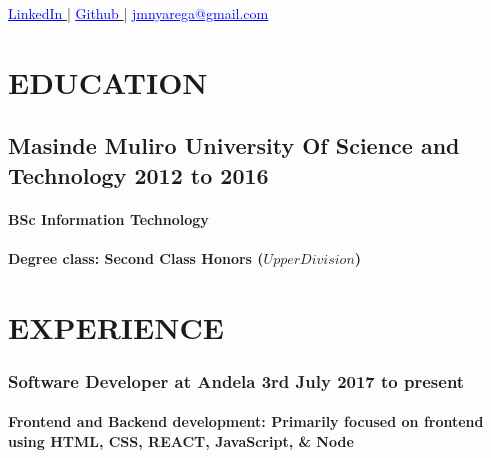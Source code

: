 \documentclass{article}
\author{Josiah Mokobo Nyarega}
\begin{document}
\renewcommand{\maketitle}{
  \begin{center}
    {
      \huge\bfseries
      \theauthor
    }

    \href{https://www.linkedin.com/in/josiah-nyarega-84820a103}{
      \textcolor{blue}{
        \underline{LinkedIn}
      }
    } |
    \href{https://www.github.com/jmnyarega}{
      \textcolor{blue}{
      \underline{Github}
      }
    } |
    \href{jmnyarega@gmail.com}{
      \textcolor{blue}{
        \underline{jmnyarega@gmail.com}
      }
    }
\end{center}
}
\maketitle

\section{EDUCATION}
\subsection{Masinde Muliro University Of Science and Technology\hspace{130pt} \textbf{2012 to 2016}}
\paragraph{BSc Information Technology}
\paragraph{Degree class: Second Class Honors (\(Upper Division\))}
\section{EXPERIENCE}
\subsubsection{Software Developer at Andela\hspace{190pt} \textbf{3rd July 2017 to present}}
\paragraph{Frontend and Backend development: Primarily focused on frontend using HTML, CSS, REACT, JavaScript, \& Node}
\end{document}
